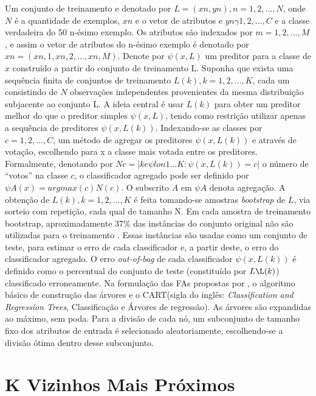 Um conjunto de treinamento e denotado por $ L = {(xn, yn), n = 1, 2,...,N} $, onde $ N $  é a quantidade de exemplos, $ xn $ e o vetor de atributos e $ yn \gamma {1, 2,...,C} $ e a classe verdadeira do 50 n-ésimo exemplo. Os atributos são indexados por $ m = 1, 2,...,M $, e assim o vetor de atributos do n-ésimo exemplo é denotado por  $ xn = (xn,1, xn,2,...,xn,M) $. Denote por $ \psi (x,L) $ um preditor para a classe de $ x $ construído a partir do conjunto de treinamento L. Suponha que exista uma sequência finita de conjuntos de treinamento $ {L(k) }, k = 1, 2,...,K $, cada um consistindo de $ N $ observações independentes provenientes da mesma distribuição subjacente ao conjunto L. A ideia central é usar $ {L(k) } $ para obter um preditor melhor do que o preditor simples $ \psi (x,L) $, tendo como restrição utilizar apenas a sequência de preditores $ \psi (x,L(k)) $. Indexando-se as classes por $ c = 1, 2,...,C $, um método de agregar os preditores $ \psi (x,L(k)) $ e através de votação, escolhendo para x a classe mais votada entre os preditores. Formalmente, denotando por $ Nc = |{k e\psi lon {1 ...K} : \psi (x,L(k) ) = c}| $ o número de “votos” na classe $ c $, o classificador agregado pode ser definido por $ \psi A(x) = arg max(c) N(c) $. O subscrito $ A $ em $ \psi A $ denota agregação. A obtenção de $ {L(k) }, k = 1, 2,...,K $ é feita tomando-se amostras \textit{bootstrap} de $ L $, via sorteio com repetição, cada qual de tamanho N. Em cada amostra de treinamento bootstrap, aproximadamente 37\% das instâncias do conjunto original  não são utilizadas para o treinamento \cite{breiman1996bagging}. Essas instâncias são usadas como um conjunto de teste, para estimar o erro de cada classificador e, a partir deste, o erro do classificador agregado. O erro \textit{out-of-bag} de cada classificador $ \psi (x,L(k)) $ é definido como o percentual do conjunto de teste (constituído por $ L\L(k) $) classificado erroneamente. Na formulação das FAs propostas por \cite{breiman2001random}, o algoritmo básico de construção das árvores e o CART(sigla do inglês: \textit{Classification and Regression Trees}, Classificação e Árvores de regressão)\cite{breiman2017classification}. As árvores são expandidas ao máximo, sem poda. Para a divisão de cada nó, um subconjunto de tamanho fixo dos atributos de entrada é selecionado aleatoriamente, escolhendo-se a divisão ótima dentro desse subconjunto.

\section{K Vizinhos Mais Próximos}

